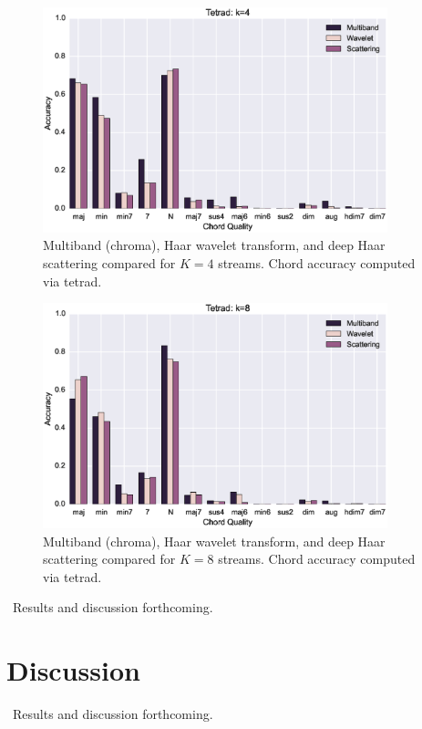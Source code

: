 \documentclass{article}
\begin{document}
\begin{figure}
 \centerline{
 \includegraphics[width=10cm]{figs/tetrad4.eps}}
 \caption{Multiband (chroma), Haar wavelet transform, and deep Haar scattering compared for $K=4$ streams. Chord accuracy computed via tetrad.}
 \label{fig:tetrad4}
\end{figure}

\begin{figure}
 \centerline{
 \includegraphics[width=10cm]{figs/tetrad8.eps}}
 \caption{Multiband (chroma), Haar wavelet transform, and deep Haar scattering compared for $K=8$ streams. Chord accuracy computed via tetrad.}
 \label{fig:tetrad8}
\end{figure}

~Results and discussion forthcoming.~
	

\section{Discussion}\label{sec:discussion}

~Results and discussion forthcoming.~





%
%
%
%
\end{document}
